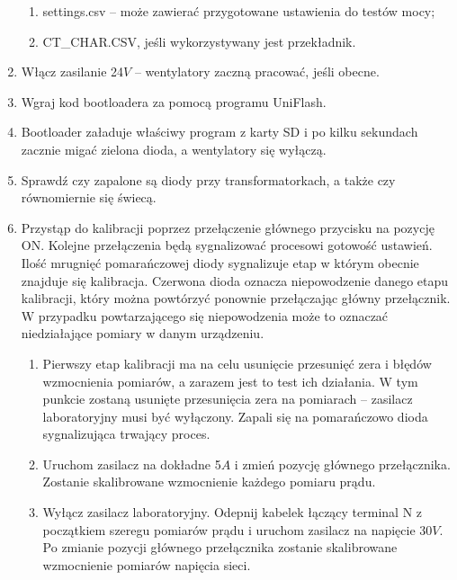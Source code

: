 \documentclass[12pt,a4paper]{article}
\begin{document}
\begin{enumerate}
\begin{enumerate}
		\item settings.csv – może zawierać przygotowane ustawienia do testów mocy;

		\item CT\_CHAR.CSV, jeśli wykorzystywany jest przekładnik.
		\vspace{-2mm}
	\end{enumerate}

	\item Włącz zasilanie 24$V$ – wentylatory zaczną pracować, jeśli obecne.

	\item Wgraj kod bootloadera za pomocą programu UniFlash.

	\item Bootloader załaduje właściwy program z karty SD i po kilku sekundach zacznie migać zielona dioda, a wentylatory się wyłączą.

	\item Sprawdź czy zapalone są diody przy transformatorkach, a także czy równomiernie się świecą.

	\item Przystąp do kalibracji poprzez przełączenie głównego przycisku na pozycję ON. Kolejne przełączenia będą sygnalizować procesowi gotowość ustawień. Ilość mrugnięć pomarańczowej diody sygnalizuje etap w którym obecnie znajduje się kalibracja. Czerwona dioda oznacza niepowodzenie danego etapu kalibracji, który można powtórzyć ponownie przełączając główny przełącznik. W przypadku powtarzającego się niepowodzenia może to oznaczać niedziałające pomiary w danym urządzeniu.
	
	\begin{enumerate}
		\vspace{-2mm}
		\setlength\itemsep{0mm}
		\item Pierwszy etap kalibracji ma na celu usunięcie przesunięć zera i błędów wzmocnienia pomiarów, a zarazem jest to test ich działania. W tym punkcie zostaną usunięte przesunięcia zera na pomiarach – zasilacz laboratoryjny musi być wyłączony. Zapali się na pomarańczowo dioda sygnalizująca trwający proces. 

		\item Uruchom zasilacz na dokładne 5$A$ i zmień pozycję głównego przełącznika. Zostanie skalibrowane wzmocnienie każdego pomiaru prądu.

		\item Wyłącz zasilacz laboratoryjny. Odepnij kabelek łączący terminal N z początkiem szeregu pomiarów prądu i uruchom zasilacz na napięcie 30$V$. Po zmianie pozycji głównego przełącznika zostanie skalibrowane wzmocnienie pomiarów napięcia sieci.


\end{enumerate}
\end{enumerate}
\end{document}
